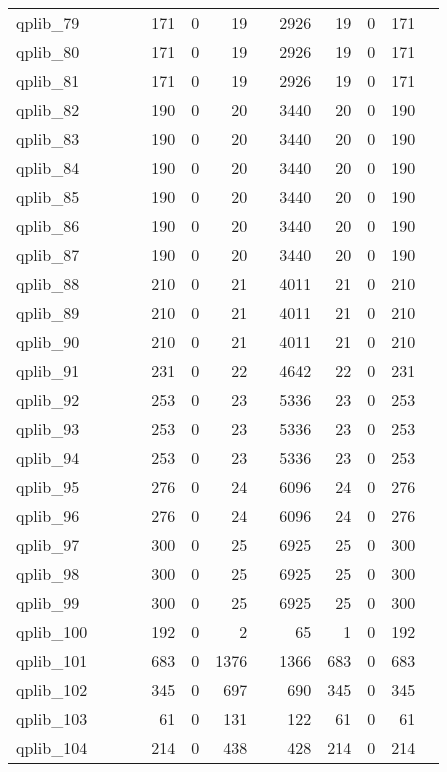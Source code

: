 \begin{table}
\begin{tabular}{lrrrrrrrrrrrr}
qplib\_79	&		&		&	&	171	&	0	&	19	&	&	2926	&	19	&	0	&	171	\\
qplib\_80	&		&		&	&	171	&	0	&	19	&	&	2926	&	19	&	0	&	171	\\
qplib\_81	&		&		&	&	171	&	0	&	19	&	&	2926	&	19	&	0	&	171	\\
qplib\_82	&		&		&	&	190	&	0	&	20	&	&	3440	&	20	&	0	&	190	\\
qplib\_83	&		&		&	&	190	&	0	&	20	&	&	3440	&	20	&	0	&	190	\\
qplib\_84	&		&		&	&	190	&	0	&	20	&	&	3440	&	20	&	0	&	190	\\
qplib\_85	&		&		&	&	190	&	0	&	20	&	&	3440	&	20	&	0	&	190	\\
qplib\_86	&		&		&	&	190	&	0	&	20	&	&	3440	&	20	&	0	&	190	\\
qplib\_87	&		&		&	&	190	&	0	&	20	&	&	3440	&	20	&	0	&	190	\\
qplib\_88	&		&		&	&	210	&	0	&	21	&	&	4011	&	21	&	0	&	210	\\
qplib\_89	&		&		&	&	210	&	0	&	21	&	&	4011	&	21	&	0	&	210	\\
qplib\_90	&		&		&	&	210	&	0	&	21	&	&	4011	&	21	&	0	&	210	\\
qplib\_91	&		&		&	&	231	&	0	&	22	&	&	4642	&	22	&	0	&	231	\\
qplib\_92	&		&		&	&	253	&	0	&	23	&	&	5336	&	23	&	0	&	253	\\
qplib\_93	&		&		&	&	253	&	0	&	23	&	&	5336	&	23	&	0	&	253	\\
qplib\_94	&		&		&	&	253	&	0	&	23	&	&	5336	&	23	&	0	&	253	\\
qplib\_95	&		&		&	&	276	&	0	&	24	&	&	6096	&	24	&	0	&	276	\\
qplib\_96	&		&		&	&	276	&	0	&	24	&	&	6096	&	24	&	0	&	276	\\
qplib\_97	&		&		&	&	300	&	0	&	25	&	&	6925	&	25	&	0	&	300	\\
qplib\_98	&		&		&	&	300	&	0	&	25	&	&	6925	&	25	&	0	&	300	\\
qplib\_99	&		&		&	&	300	&	0	&	25	&	&	6925	&	25	&	0	&	300	\\
qplib\_100	&		&		&	&	192	&	0	&	2	&	&	65	&	1	&	0	&	192	\\
qplib\_101	&		&		&	&	683	&	0	&	1376	&	&	1366	&	683	&	0	&	683	\\
qplib\_102	&		&		&	&	345	&	0	&	697	&	&	690	&	345	&	0	&	345	\\
qplib\_103	&		&		&	&	61	&	0	&	131	&	&	122	&	61	&	0	&	61	\\
qplib\_104	&		&		&	&	214	&	0	&	438	&	&	428	&	214	&	0	&	214	\\

\end{tabular}
\end{table}
